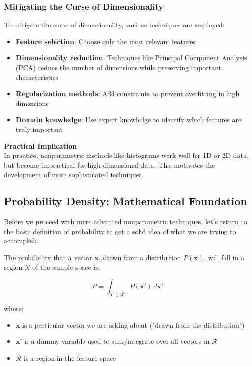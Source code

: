 \documentclass[11pt,a4paper]{article}
\theoremstyle{definition}
\theoremstyle{plain}
\theoremstyle{remark}
\begin{document}
\subsubsection{Mitigating the Curse of Dimensionality}

To mitigate the curse of dimensionality, various techniques are employed:

\begin{itemize}
    \item \textbf{Feature selection}: Choose only the most relevant features
    
    \item \textbf{Dimensionality reduction}: Techniques like Principal Component Analysis (PCA) reduce the number of dimensions while preserving important characteristics
    
    \item \textbf{Regularization methods}: Add constraints to prevent overfitting in high dimensions
    
    \item \textbf{Domain knowledge}: Use expert knowledge to identify which features are truly important
\end{itemize}

\begin{center}
\colorbox{yellow!20}{\parbox{0.9\textwidth}{
\textbf{Practical Implication}\\[0.2cm]
In practice, nonparametric methods like histograms work well for 1D or 2D data, but become impractical for high-dimensional data. This motivates the development of more sophisticated techniques.
}}
\end{center}

\subsection{Probability Density: Mathematical Foundation}

Before we proceed with more advanced nonparametric techniques, let's return to the basic definition of probability to get a solid idea of what we are trying to accomplish.

\begin{tcolorbox}[colback=cyan!5!white,colframe=cyan!75!black,title=\textbf{Probability in a Region}]
The probability that a vector $\mathbf{x}$, drawn from a distribution $P(\mathbf{x})$, will fall in a region $\mathcal{R}$ of the sample space is:

\[
P = \int_{\mathbf{x}' \in \mathcal{R}} P(\mathbf{x}') \, d\mathbf{x}'
\]

where:
\begin{itemize}
    \item $\mathbf{x}$ is a particular vector we are asking about ("drawn from the distribution")
    \item $\mathbf{x}'$ is a dummy variable used to sum/integrate over all vectors in $\mathcal{R}$
    \item $\mathcal{R}$ is a region in the feature space
\end{itemize}
\end{tcolorbox}
\end{document}
